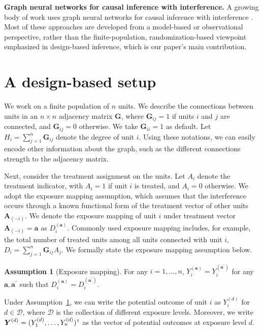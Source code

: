 \documentclass{article}
\theoremstyle{plain}
\theoremstyle{definition}
\newtheorem{assumption}[theorem]{Assumption}
\theoremstyle{remark}
\def\T{{\textsc{t}}}
\newcommand{\bY}{\boldsymbol{Y}}
\newcommand{\ba}{\boldsymbol{a}}
\newcommand{\bA}{\boldsymbol{A}}
\newcommand{\bG}{\boldsymbol{G}}
\newcommand{\cD}{\mathcal{D}}
\newcommand{\sumj}{\sum_{j=1}^n}
\begin{document}
\textbf{Graph neural networks for causal inference with interference.} A growing body of work uses graph neural networks for causal inference with interference \citep{wu2025causal, jiang2022estimating, guo2020learning, guo2021ignite, cai2023generalization, chen2024doubly, ma2021causal, du2025telling, ma2022learning, leung2022graph}. Most of these approaches are developed from a model-based or observational perspective, rather than the finite-population, randomization-based viewpoint emphasized in design-based inference, which is our paper's main contribution.


\section{A design-based setup}
We work on a finite population of $n$ units. We describe the connections between units in an $n\times n$ adjacency matrix $\bG$, where $\bG_{ij}=1$ if units $i$ and $j$ are connected, and $\bG_{ij}=0$ otherwise. We take $\bG_{ii}=1$ as default. Let $H_{i} = \sumj \bG_{ij}$ denote the degree of unit $i$. Using these notations, we can easily encode other information about the graph, such as the different connections strength to the adjacency matrix. 

Next, consider the treatment assignment on the units. Let $A_i$ denote the treatment indicator, with $A_i=1$ if unit $i$ is treated, and $A_i=0$ otherwise. We adopt the exposure mapping assumption, which assumes that the interference occurs through a known functional form of the treatment vector of other units $\bA_{(-i)}$. We denote the exposure mapping of  unit $i$ under treatment vector $\bA_{(-i)}=\ba$ as $D_i^{(\ba)}$. Commonly used exposure mapping includes, for example, the total number of treated units among all units connected with unit $i$, $D_i = \sumj \bG_{ij}A_j$. We formally state the exposure mapping assumption below.
\begin{assumption}[Exposure mapping]
\label{assump::exposure}
    For any $i=1,\ldots,n$, $Y_i^{(\ba)} = Y_i^{(\ba^{\prime})}$ for any $\ba,\ba^{\prime}$ such that $D_i^{(\ba)}=D_i^{(\ba^{\prime})}$.
\end{assumption}
Under Assumption~\ref{assump::exposure}, we can write the potential outcome of unit $i$ as $Y_i^{(d)}$ for $d\in\cD$, where $\cD$ is the collection of different exposure levels. Moreover, we write $\bY^{(d)} = (Y_1^{(d)}, \ldots, Y_n^{(d)})^\T$ as the vector of potential outcomes at exposure level $d$.
\end{document}

